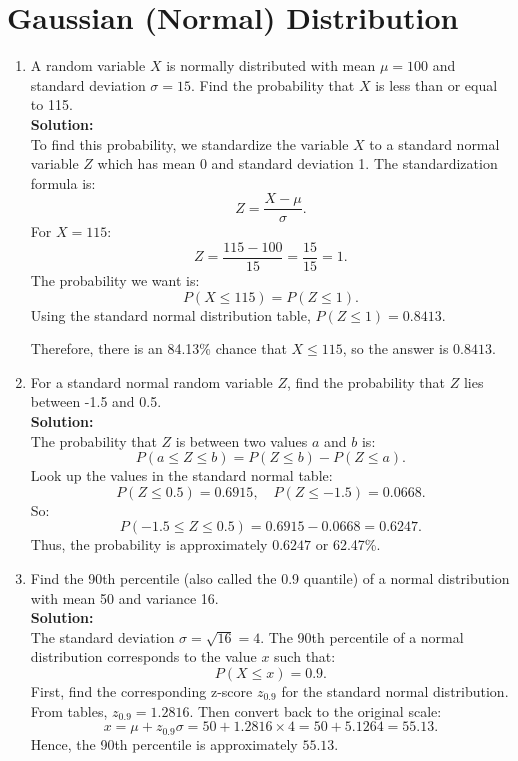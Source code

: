 \documentclass{book}
\begin{document}
\section*{Gaussian (Normal) Distribution}

\begin{enumerate}[label=Exercise \arabic*:]
    \item A random variable \(X\) is normally distributed with mean \(\mu = 100\) and standard deviation \(\sigma = 15\). Find the probability that \(X\) is less than or equal to 115. \\
    \textbf{Solution:} \\
    To find this probability, we standardize the variable \(X\) to a standard normal variable \(Z\) which has mean 0 and standard deviation 1. The standardization formula is:
    \[
    Z = \frac{X - \mu}{\sigma}.
    \]
    For \(X = 115\):
    \[
    Z = \frac{115 - 100}{15} = \frac{15}{15} = 1.
    \]
    The probability we want is:
    \[
    P(X \leq 115) = P(Z \leq 1).
    \]
    Using the standard normal distribution table, \(P(Z \leq 1) = 0.8413\).
    
    Therefore, there is an 84.13\% chance that \(X \leq 115\), so the answer is \(\boxed{0.8413}\).

    \item For a standard normal random variable \(Z\), find the probability that \(Z\) lies between -1.5 and 0.5. \\
    \textbf{Solution:} \\
    The probability that \(Z\) is between two values \(a\) and \(b\) is:
    \[
    P(a \leq Z \leq b) = P(Z \leq b) - P(Z \leq a).
    \]
    Look up the values in the standard normal table:
    \[
    P(Z \leq 0.5) = 0.6915, \quad P(Z \leq -1.5) = 0.0668.
    \]
    So:
    \[
    P(-1.5 \leq Z \leq 0.5) = 0.6915 - 0.0668 = 0.6247.
    \]
    Thus, the probability is approximately \(\boxed{0.6247}\) or 62.47\%.

    \item Find the 90th percentile (also called the 0.9 quantile) of a normal distribution with mean 50 and variance 16. \\
    \textbf{Solution:} \\
    The standard deviation \(\sigma = \sqrt{16} = 4\). The 90th percentile of a normal distribution corresponds to the value \(x\) such that:
    \[
    P(X \leq x) = 0.9.
    \]
    First, find the corresponding z-score \(z_{0.9}\) for the standard normal distribution. From tables, \(z_{0.9} = 1.2816\).
    Then convert back to the original scale:
    \[
    x = \mu + z_{0.9} \sigma = 50 + 1.2816 \times 4 = 50 + 5.1264 = 55.13.
    \]
    Hence, the 90th percentile is approximately \(\boxed{55.13}\).
\end{enumerate}
\end{document}

